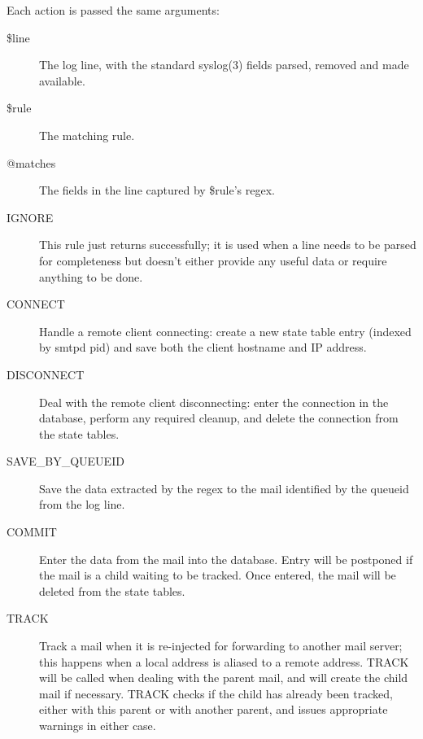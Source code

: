 \documentclass[a4paper,12pt,draft]{article}
\begin{document}
\label{actions-in-detail}

Each action is passed the same arguments: 

\begin{description}

    \item [\$line] The log line, with the standard syslog(3) fields parsed,
        removed and made available.
        
    \item [\$rule] The matching rule.
        
    \item [@matches] The fields in the line captured by \$rule's regex.

\end{description}

\begin{description}

    \item [IGNORE] This rule just returns successfully; it is used when a
        line needs to be parsed for completeness but doesn't either provide
        any useful data or require anything to be done.

    \item [CONNECT] Handle a remote client connecting: create a new state
        table entry (indexed by smtpd pid) and save both the client
        hostname and IP address.

    \item [DISCONNECT] Deal with the remote client disconnecting: enter the
        connection in the database, perform any required cleanup, and
        delete the connection from the state tables.

    \item [SAVE\_BY\_QUEUEID] Save the data extracted by the regex to the
        mail identified by the queueid from the log line.

    \item [COMMIT] Enter the data from the mail into the database. Entry
        will be postponed if the mail is a child waiting to be tracked.
        Once entered, the mail will be deleted from the state tables.

    \item [TRACK] Track a mail when it is re-injected for forwarding to
        another mail server; this happens when a local address is aliased
        to a remote address.  TRACK will be called when dealing with the
        parent mail, and will create the child mail if necessary. TRACK
        checks if the child has already been tracked, either with this
        parent or with another parent, and issues appropriate warnings in
        either case.


\end{description}
\end{document}
